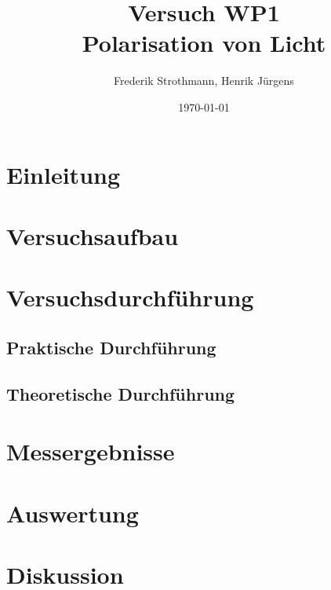 \documentclass[12pt]{scrartcl}
\title{Versuch WP1\\ Polarisation von Licht}
\author{Frederik Strothmann, Henrik Jürgens}
\date{\today}
\begin{document}

\maketitle



\section{Einleitung}



\section{Versuchsaufbau}


\section{Versuchsdurchführung}


\subsection{Praktische Durchführung}


\subsection{Theoretische Durchführung}


\section{Messergebnisse}



\section{Auswertung}


\section{Diskussion}


\end{document}
